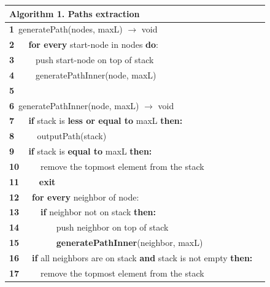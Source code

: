 \documentclass{l4proj}
\begin{document}
\begin{table}[h]
 \centering
 \label{Algorithm 1.}
 \begin{tabular}{l l}
	\textbf{Algorithm 1.} Paths extraction \\\hline
    \small\textbf{1}  \,\small{generatePath(nodes, maxL) $\rightarrow$ void}\\
    \small\textbf{2}  \,\,\,\,\,\,\,\,\small{\textbf{for every} start-node in nodes \textbf{do}:}\\
    \small\textbf{3}  \,\,\,\,\,\,\,\,\,\,\,\,\,\small{push start-node on top of stack}\\
    \small\textbf{4}  \,\,\,\,\,\,\,\,\,\,\,\,\,\small{generatePathInner(node, maxL)}\\
    \small\textbf{5}  \\
    \small\textbf{6}  \,\small{generatePathInner(node, maxL) $\rightarrow$ void}\\
    \small\textbf{7}  \,\,\,\,\,\,\,\,\small{\textbf{if} stack is \textbf{ less or equal to} maxL \textbf{then:}}\\
    \small\textbf{8}  \,\,\,\,\,\,\,\,\,\,\,\,\,\,\small{outputPath(stack)}\\
    \small\textbf{9}  \,\,\,\,\,\,\,\,\small{\textbf{if} stack is \textbf{equal to} maxL \textbf{then:}}\\
    \small\textbf{10} \,\,\,\,\,\,\,\,\,\,\,\,\,\small{remove the topmost element from the stack}\\
    \small\textbf{11} \,\,\,\,\,\,\,\,\,\,\,\,\small{\textbf{exit}}\\
    \small\textbf{12} \,\,\,\,\,\,\,\small{\textbf{for every} neighbor of node:}\\
    \small\textbf{13} \,\,\,\,\,\,\,\,\,\,\,\,\,\small{\textbf{if} neighbor not on stack \textbf{then:}}\\
    \small\textbf{14} \,\,\,\,\,\,\,\,\,\,\,\,\,\,\,\,\,\,\,\,\,\,\,\,\small{push neighbor on top of stack}\\
    \small\textbf{15} \,\,\,\,\,\,\,\,\,\,\,\,\,\,\,\,\,\,\,\,\,\,\,\,\small{\textbf{generatePathInner}(neighbor, maxL)}\\
    \small\textbf{16} \,\,\,\,\,\,\,\small{\textbf{if} all neighbors are on stack \textbf{and} stack is not empty \textbf{then:}}\\
    \small\textbf{17} \,\,\,\,\,\,\,\,\,\,\,\,\,\small{remove the topmost element from the stack}\\
    \hline
 \end{tabular}%
\end{table}
\end{document}
